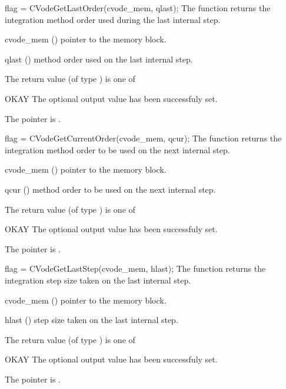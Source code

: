 {
  flag = CVodeGetLastOrder(cvode\_mem, qlast);
}
{
  The function  returns the
  integration method order used during the last internal step.
}
{
  \begin{args}
  \item[cvode\_mem] ()
    pointer to the {\cvode} memory block.
  \item[qlast] ()
    method order used on the last internal step.
  \end{args}
}
{
  The return value  (of type ) is one of
  \begin{args}
  \item[OKAY] 
    The optional output value has been successfuly set.
  \item[\Id{CVG\_NO\_MEM}]
    The  pointer is .
  \end{args}
}
{}
{
  flag = CVodeGetCurrentOrder(cvode\_mem, qcur);
}
{
  The function  returns the
  integration method order to be used on the next internal step.
}
{
  \begin{args}
  \item[cvode\_mem] ()
    pointer to the {\cvode} memory block.
  \item[qcur] ()
    method order to be used on the next internal step.
  \end{args}
}
{
  The return value  (of type ) is one of
  \begin{args}
  \item[OKAY] 
    The optional output value has been successfuly set.
  \item[\Id{CVG\_NO\_MEM}]
    The  pointer is .
  \end{args}
}
{}
{
  flag = CVodeGetLastStep(cvode\_mem, hlast);
}
{
  The function  returns the
  integration step size taken on the last internal step.
}
{
  \begin{args}
  \item[cvode\_mem] ()
    pointer to the {\cvode} memory block.
  \item[hlast] ()
    step size taken on the last internal step.
  \end{args}
}
{
  The return value  (of type ) is one of
  \begin{args}
  \item[OKAY] 
    The optional output value has been successfuly set.
  \item[\Id{CVG\_NO\_MEM}]
    The  pointer is .
  \end{args}
}
